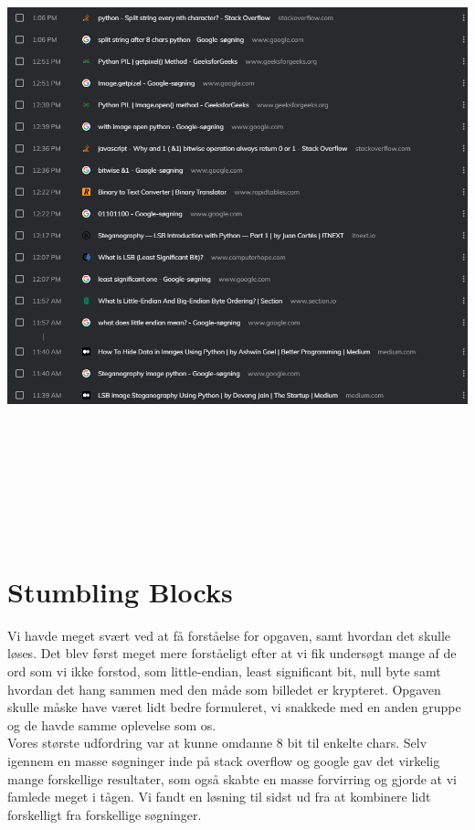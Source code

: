 \documentclass{report}
\begin{document}
\includegraphics[height=19cm, width=15cm]{Screenshot 2021-02-10 144040.png}


\section*{Stumbling Blocks}

Vi havde meget svært ved at få forståelse for opgaven, samt hvordan det skulle løses. Det blev først meget mere forståeligt efter at vi fik undersøgt mange af de ord som vi ikke forstod, som little-endian, least significant bit, null byte samt hvordan det hang sammen med den måde som billedet er krypteret. Opgaven skulle måske have været lidt bedre formuleret, vi snakkede med en anden gruppe og de havde samme oplevelse som os.\\


Vores største udfordring var at kunne omdanne 8 bit til enkelte chars. Selv igennem en masse søgninger inde på stack overflow og google gav det virkelig mange forskellige resultater, som også skabte en masse forvirring og gjorde at vi famlede meget i tågen. Vi fandt en løsning til sidst ud fra at kombinere lidt forskelligt fra forskellige søgninger.\\
\end{document}
